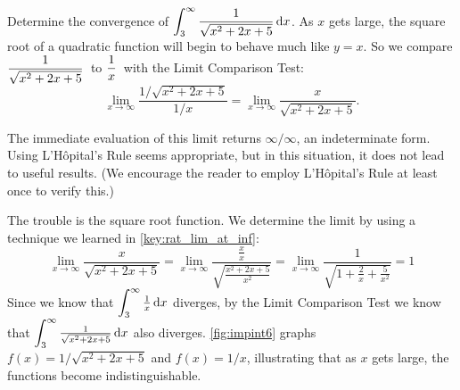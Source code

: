 \begin{example}\label{ex_impint6}%
Determine the convergence of $\displaystyle \int_3^{\infty} \frac{1}{\sqrt{x^2+2x+5}}\operatorname{d}\! x$.
\solution
As $x$ gets large, the square root of a quadratic function will begin to behave much like $y=x$. So we compare \small$\displaystyle\frac{1}{\sqrt{x^2+2x+5}}$\normalsize\ to \small$\displaystyle\frac1x$\normalsize\ with the Limit Comparison Test:
\[
\lim_{x\to\infty} \frac{1/\sqrt{x^2+2x+5}}{1/x}
= \lim_{x\to\infty}\frac{x}{\sqrt{x^2+2x+5}}.
\]

The immediate evaluation of this limit returns $\infty/\infty$, an indeterminate form. Using L'Hôpital's Rule seems appropriate, but in this situation, it does not lead to useful results. (We encourage the reader to employ L'Hôpital's Rule at least once to verify this.)

The trouble is the square root function.
We determine the limit by using a technique we learned in \autoref{key:rat_lim_at_inf}:
%
%
\[
 \lim_{x\to\infty}\frac x{\sqrt{x^2+2x+5}}
 =\lim_{x\to\infty}\frac{\frac xx}{\sqrt{\frac{x^2+2x+5}{x^2}}}
 =\lim_{x\to\infty}\frac1{\sqrt{1+\frac2x+\frac5{x^2}}}=1
\]
Since we know that $\displaystyle\int_3^{\infty} \tfrac1x\operatorname{d}\! x$ diverges, by the Limit Comparison Test we know that $\displaystyle\int_3^\infty\tfrac1{\sqrt{x^2+2x+5}}\operatorname{d}\! x$ also diverges. \autoref{fig:impint6} graphs $f(x)=1/\sqrt{x^2+2x+5}$ and $f(x)=1/x$, illustrating that as $x$ gets large, the functions become indistinguishable.
\end{example}

